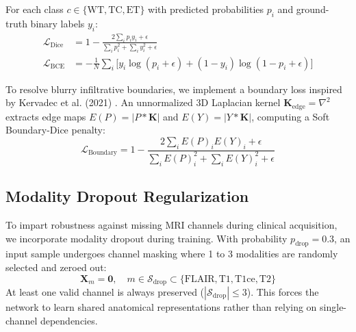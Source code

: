 \documentclass[12pt, a4paper]{article}
\begin{document}
For each class $c \in \{\text{WT}, \text{TC}, \text{ET}\}$ with predicted probabilities $p_i$ and ground-truth binary labels $y_i$:
\begin{align}
    \mathcal{L}_{\text{Dice}} &= 1 - \frac{2 \sum_i p_i y_i + \epsilon}{\sum_i p_i^2 + \sum_i y_i^2 + \epsilon} \\
    \mathcal{L}_{\text{BCE}} &= -\frac{1}{N} \sum_i \Big[y_i \log(p_i + \epsilon) + (1 - y_i)\log(1 - p_i + \epsilon)\Big]
\end{align}

To resolve blurry infiltrative boundaries, we implement a boundary loss inspired by Kervadec et al. (2021) \cite{kervadec2019boundary}. An unnormalized 3D Laplacian kernel $\mathbf{K}_{\text{edge}} = \nabla^2$ extracts edge maps $E(P) = |P \ast \mathbf{K}|$ and $E(Y) = |Y \ast \mathbf{K}|$, computing a Soft Boundary-Dice penalty:
\begin{equation}
    \mathcal{L}_{\text{Boundary}} = 1 - \frac{2 \sum_i E(P)_i E(Y)_i + \epsilon}{\sum_i E(P)_i^2 + \sum_i E(Y)_i^2 + \epsilon}
\end{equation}

\subsection{Modality Dropout Regularization}
To impart robustness against missing MRI channels during clinical acquisition, we incorporate modality dropout during training. With probability $p_{\text{drop}} = 0.3$, an input sample undergoes channel masking where 1 to 3 modalities are randomly selected and zeroed out:
\begin{equation}
    \mathbf{X}_m = \mathbf{0}, \quad m \in \mathcal{S}_{\text{drop}} \subset \{\text{FLAIR}, \text{T1}, \text{T1ce}, \text{T2}\}
\end{equation}
At least one valid channel is always preserved ($|\mathcal{S}_{\text{drop}}| \le 3$). This forces the network to learn shared anatomical representations rather than relying on single-channel dependencies.
\end{document}
